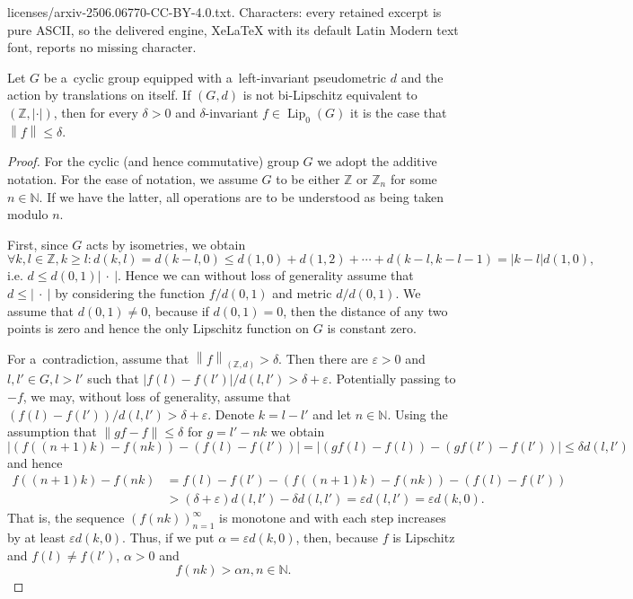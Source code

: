 \documentclass[10pt,a4paper]{amsart}
\newcommand{\Lipz}{\operatorname{Lip}_0}
\newcommand{\N}{\mathbb{N}}
\newcommand{\Z}{\mathbb{Z}}
\newcommand{\absFunc}{\abs{\: \cdot \: }}
\newcommand{\abs}[1]{\left| #1 \right|}
\newcommand{\eps}{\varepsilon}
\newcommand{\norm}[1]{\left\| #1 \right\|}
\begin{document}
licenses/arxiv-2506.06770-CC-BY-4.0.txt. Characters: every retained excerpt is pure ASCII, so the delivered engine, XeLaTeX with its default Latin Modern text font, reports no missing character.
	\begin{lemma} \label{lma:badZ}
		Let $G$ be a~cyclic group equipped with a~left-invariant pseudometric $d$ and the action by translations on itself. If $(G, d)$ is not bi-Lipschitz equivalent to $(\Z, \abs{\cdot})$, then for every $\delta > 0$ and $\delta$-invariant $f \in \Lipz(G)$ it is the case that $\norm{f} \leq \delta$.
	\end{lemma}

	\begin{proof}
		For the cyclic (and hence commutative) group $G$ we adopt the additive notation. For the ease of notation, we assume $G$ to be either $\Z$ or $\Z_n$ for some $n \in \N$. If we have the latter, all operations are to be understood as being taken modulo $n$.
		
		First, since $G$ acts by isometries, we obtain
		\begin{equation*}
			\forall k, l \in \Z, k \geq l \colon d(k, l) = d(k-l, 0) \leq d(1, 0) + d(1, 2) + \cdots + d(k-l, k-l-1) = \abs{k-l}d(1, 0),
		\end{equation*}
		i.e. $d \leq d(0,1)\absFunc$. Hence we can without loss of generality assume that $d \leq \absFunc$ by considering the function $f/d(0,1)$ and metric $d/d(0,1)$. We assume that $d(0, 1) \neq 0$, because if $d(0, 1) = 0$, then the distance of any two points is zero and hence the only Lipschitz function on $G$ is constant zero.
		
		For a~contradiction, assume that $\norm{f}_{(\Z, d)} > \delta$. Then there are $\eps > 0$ and $l, l' \in G, l > l'$ such that $\abs{f(l) - f(l')}/d(l, l') > \delta + \eps$. Potentially passing to $-f$, we may, without loss of generality, assume that $(f(l) - f(l'))/d(l, l') > \delta + \eps$. Denote $k = l - l'$ and let $n \in \N$. Using the assumption that $\norm{gf - f} \leq \delta$ for $g = l' - nk$ we obtain
		\begin{equation*}
			\abs{(f((n+1)k) - f(nk)) - (f(l) - f(l'))}
			= \abs{(gf(l) - f(l)) - (gf(l') - f(l'))}
			\leq \delta d(l, l')
		\end{equation*}
		and hence
		\begin{align*}
			f((n+1)k) - f(nk)
			&= f(l) - f(l') - (f((n+1)k) - f(nk)) - (f(l) - f(l'))\\
			&> (\delta + \eps) d(l, l') - \delta d(l, l')
			= \eps d(l, l')
			= \eps d(k, 0).
		\end{align*}
		That is, the sequence $(f(nk))_{n=1}^\infty$ is monotone and with each step increases by at least $\eps d(k, 0)$. Thus, if we put $\alpha = \eps d(k, 0)$, then, because $f$ is Lipschitz and $f(l) \neq f(l')$, $\alpha > 0$ and 
		\begin{equation} \label{eqn:badZ}
			f(nk) > \alpha n, n \in \N.
		\end{equation}
		

\end{proof}
\end{document}
